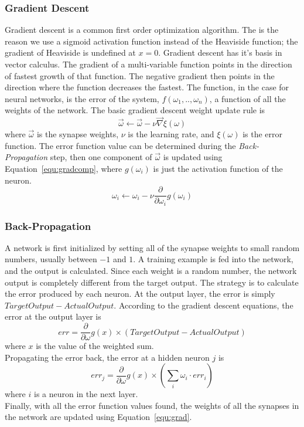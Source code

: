 \documentclass[journal]{IEEEtran}
\begin{document}
  \subsubsection*{Gradient Descent}
  Gradient descent is a common first order optimization algorithm. The is the reason we use a sigmoid
  activation function instead of the Heaviside function; the gradient of Heaviside is undefined at
  $x=0$. Gradient descent has it's basis in vector calculus. The gradient of a multi-variable function
  points in the direction of fastest growth of that function. The negative gradient then points in the
  direction where the function decreases the fastest. The function, in the case for neural networks,
  is the error of the system, $f(\omega_1,..,\omega_n)$, a function of all the weights of the network.
  The basic gradient descent weight update rule is
  \begin{equation}
    \vec{\omega} \leftarrow \vec{\omega} - \nu\vec{\nabla}\xi(\omega)
    \label{equ:grad}
  \end{equation}
  where $\vec{\omega}$ is the synapse weights, $\nu$ is the learning rate, and $\xi(\omega)$ is the error function.
  The error function value can be determined during the \textit{Back-Propagation} step, then one component
  of $\vec{\omega}$ is updated using Equation~\ref{equ:gradcomp}, where $g(\omega_i)$ is just the activation
  function of the neuron.\cite{3p71text}
  \begin{equation}
    \omega_i \leftarrow \omega_i - \nu\frac{\partial}{\partial\omega_i}g(\omega_i)
    \label{equ:gradcomp}
  \end{equation}

  \subsubsection*{Back-Propagation}
  A network is first initialized by setting all of the synapse weights to small random numbers, usually
  between $-1$ and $1$. A training example is fed into the network, and the output is calculated. Since
  each weight is a random number, the network output is completely different from the target output.
  The strategy is to calculate the error produced by each neuron. At the output layer, the error is simply
  $TargetOutput - ActualOutput$. According to the gradient descent equations, the error at the output layer is
  \begin{equation}
    err = \frac{\partial}{\partial\omega}g(x) \times (TargetOutput-ActualOutput)
    \label{equ:errorout}
  \end{equation}
  where $x$ is the value of the weighted sum.\\
  Propagating the error back, the error at a hidden neuron $j$ is
  \begin{equation}
    err_j = \frac{\partial}{\partial\omega}g(x) \times \left(\sum\limits_i \omega_i \cdot err_i\right)
    \label{equ:errorhidden}
  \end{equation}
  where $i$ is a neuron in the next layer.\\
  Finally, with all the error function values found, the weights of all the synapses in the network
  are updated using Equation~\ref{equ:grad}.\cite{pdf}
\end{document}
